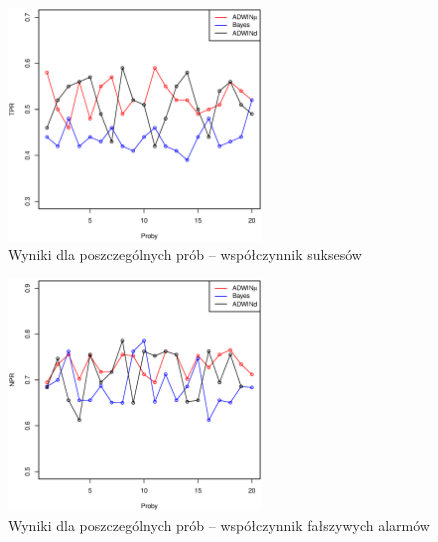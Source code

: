 \begin{figure}[htbp]
  \centering
  \includegraphics[width=0.6\textwidth]{img/ch-5-jump-res-tpr}
  \caption{Wyniki dla poszczególnych prób -- współczynnik suksesów}
  \label{fig:JumpingValuesResTpr}
\end{figure}
\begin{figure}[htbp]
  \centering
  \includegraphics[width=0.6\textwidth]{img/ch-5-jump-res-npr}
  \caption{Wyniki dla poszczególnych prób -- współczynnik fałszywych alarmów}
  \label{fig:JumpingValuesResNpr}
\end{figure}
